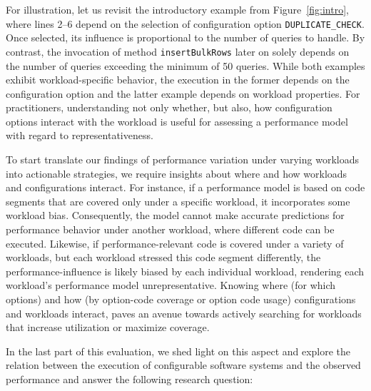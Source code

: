 
For illustration, let us revisit the introductory example from Figure~\ref{fig:intro}, where \colorbox{duplicatecheck}{lines 2--6} depend on the selection of configuration option \texttt{DUPLICATE\_CHECK}. Once selected, its influence is proportional to the number of queries to handle. By contrast, the invocation of method \texttt{insertBulkRows} later on solely depends on the number of queries exceeding the minimum of 50 queries. While both examples exhibit workload-specific behavior, the execution in the former depends on the configuration option and the latter example depends on workload properties. 
For practitioners, understanding not only whether, but also, how configuration options interact with the workload is useful for assessing a performance model with regard to representativeness. 

To start translate our findings of performance variation under varying workloads into actionable strategies, we require insights about where and how workloads and configurations interact. For instance, if a performance model is based on code segments that are covered only under a specific workload, it incorporates some workload bias. Consequently, the model cannot make accurate predictions for performance behavior under another workload, where different code can be executed. Likewise, if performance-relevant code is covered under a variety of workloads, but each workload stressed this code segment differently, the performance-influence is likely biased by each individual workload, rendering each workload's performance model unrepresentative. Knowing where (for which options) and how (by option-code coverage or option code usage) configurations and workloads interact, paves an avenue towards actively searching for workloads that increase utilization or maximize coverage.

In the last part of this evaluation, we shed light on this aspect and explore the relation between the execution of configurable software systems and the observed performance and answer the following research question:


